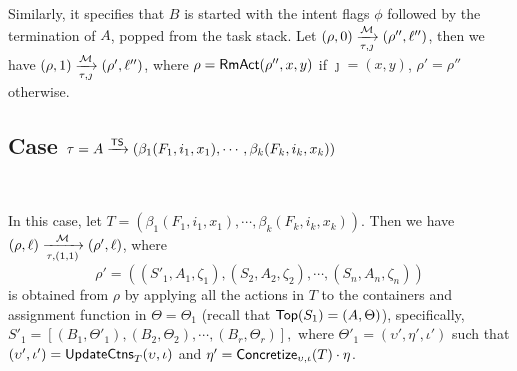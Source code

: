 {Similarly, it specifies that $B$ is started with the intent flags $\phi$ followed by the termination of $A$, popped from the task stack. Let
$(\rho,0) \xrightarrow[\tau,\jmath]{{\mathcal{M} }} (\rho'',\ell'')$, then we have $(\rho,1) \xrightarrow[\tau,\jmath]{{\mathcal{M} }} (\rho',\ell'')$, where $\rho = \mathsf{RmAct}(\rho'', x, y)$ if $\jmath = (x, y)$, $\rho' = \rho''$ otherwise.


%




\subsection{Case $\tau = A \xrightarrow{{\sf TS}} (\beta_1(F_1, i_1, x_1), \cdots, \beta_k(F_k, i_k, x_k))$}\ 

In this case, 
let $T = (\beta_1(F_1, i_1, x_1), \cdots, \beta_k(F_k, i_k, x_k))$. 
Then we have $(\rho,\ell) \xrightarrow[\tau,(1,1)]{{\mathcal{M} }} (\rho',\ell)$, where
$$\rho' = ((S'_1, A_1,\zeta_1), (S_2, A_2,\zeta_2), \cdots, (S_n, A_n,\zeta_n))$$ is obtained from $\rho$ by applying all the actions in $T$ to the containers and assignment function in $\Theta=\Theta_1$ (recall that ${\sf Top}(S_1) = (A, \Theta)$), specifically,  
$S'_1 =[(B_1, \Theta'_1), (B_2, \Theta_2), \cdots, (B_r, \Theta_r)],$ 
where $\Theta'_1 = (\upsilon', \eta', \iota')$ such that $(\upsilon', \iota') = \mathsf{UpdateCtns}_{T}(\upsilon, \iota)$ and $\eta' = \mathsf{Concretize}_{\upsilon, \iota}(T) \cdot \eta$.

}
